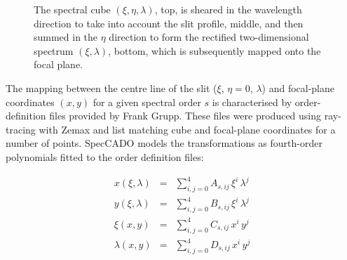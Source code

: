 \documentclass[a4paper,twoside,11pt]{article}
\begin{document}
\begin{figure}[b]
  \centering
  \caption{The spectral cube $(\xi, \eta, \lambda)$, top, is sheared
    in the wavelength direction to take into account the slit profile,
    middle, and then summed in the $\eta$ direction to form the
    rectified two-dimensional spectrum $(\xi, \lambda)$, bottom, which
    is subsequently mapped onto the focal plane.}
  \label{fig:cube_collapse}
\end{figure}

The mapping between the centre line of the slit ($\xi$, $\eta=0$,
$\lambda$) and focal-plane coordinates $(x, y)$ for a given spectral
order $s$ is characterised by order-definition files provided by Frank
Grupp. These files were produced using ray-tracing with Zemax and list
matching cube and focal-plane coordinates for a number of
points. SpecCADO models the transformations as fourth-order
polynomials fitted to the order definition files:

\begin{eqnarray}
  x(\xi, \lambda) &=& \sum_{i,j=0}^{4} A_{s,ij}\,\xi^{i}\,\lambda^{j} \label{eq:xilam2x} \\
  y(\xi, \lambda) &=& \sum_{i,j=0}^{4} B_{s,ij}\,\xi^{i}\,\lambda^{j} \label{eq:xilam2y} \\
  \xi(x, y)     &=& \sum_{i,j=0}^{4} C_{s,ij}\,x^{i}\,y^{j} \label{eq:xy2xi} \\
  \lambda(x, y) &=& \sum_{i,j=0}^{4} D_{s,ij}\,x^{i}\,y^{j} \label{eq:xy2lam}
\end{eqnarray}
\end{document}
